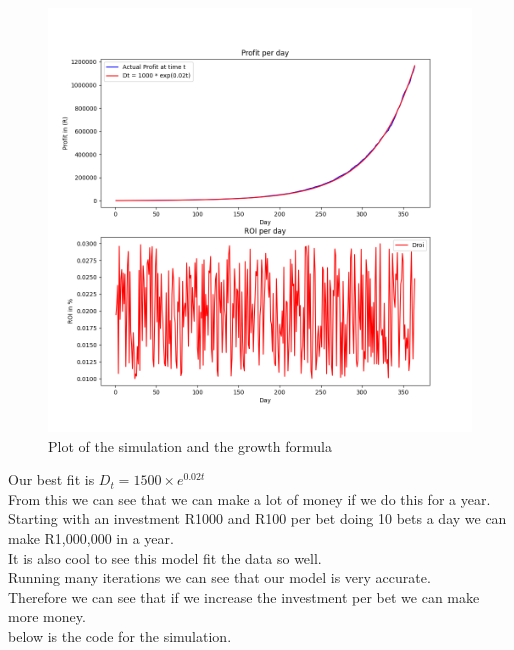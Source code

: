 \begin{figure}[H]
    \centering
    \includegraphics[scale=0.5]{images/fit.png}
    \caption{Plot of the simulation and the growth formula}
    \label{fig:plot2}
\end{figure}

Our best fit is $D_{t} = 1500 \times e^{0.02t}$\\

From this we can see that we can make a lot of money if we do this for a year.\\ 
Starting with an investment R1000 and R100 per bet doing 10 bets a day we can make R1,000,000 in a year.\\

It is also cool to see this model fit the data so well.\\

Running many iterations we can see that our model is very accurate.\\

Therefore we can see that if we increase the investment per bet we can make more money.\\
below is the code for the simulation.

